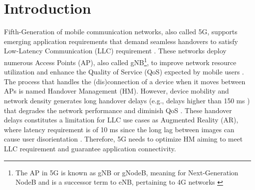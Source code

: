 \section{Introduction}
\label{sec:introduction}

Fifth-Generation of mobile communication networks, also called 5G, supports emerging application requirements that demand seamless handovers to satisfy Low-Latency Communication (LLC) requirement \cite{227}. These networks deploy numerous Access Points (AP), also called gNB\footnote{The AP in 5G is known as gNB or gNodeB, meaning for Next-Generation NodeB and is a successor term to eNB, pertaining to 4G networks \cite{590-v2}}, to improve network resource utilization and enhance the Quality of Service (QoS) expected by mobile users \cite{227,104}. The process that handles the (dis)connection of a device when it moves between APs is named Handover Management (HM). However, device mobility and network density generates long handover delays (e.g., delays higher than 150 ms \cite{403}) that degrades the network performance and diminish QoS \cite{216}. These handover delays constitutes a limitation for LLC use cases as Augmented Reality (AR), where latency requirement is of 10 ms since the long lag between images can cause user disorientation \cite{203,326,239,328}. Therefore, 5G needs to optimize HM aiming to meet LLC requirement and guarantee application connectivity.



